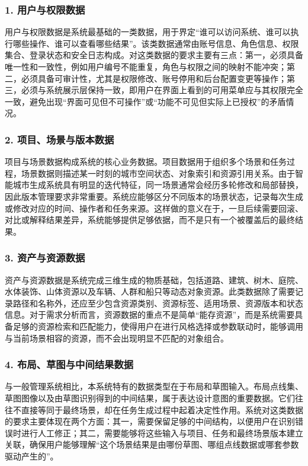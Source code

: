\documentclass[UTF8,a4paper,10pt]{ctexart}
\begin{document}
\subsubsection*{1. 用户与权限数据}
用户与权限数据是系统最基础的一类数据，用于界定“谁可以访问系统、谁可以执行哪些操作、谁可以查看哪些结果”。该类数据通常由账号信息、角色信息、权限集合、登录状态和安全日志构成。对这类数据的要求主要有三点：第一，必须具备唯一性和一致性，例如用户编号不能重复，角色与权限之间的映射不能冲突；第二，必须具备可审计性，尤其是权限修改、账号停用和后台配置变更等操作；第三，必须与系统展示层保持一致，即用户在界面上看到的可用菜单应与其权限完全一致，避免出现“界面可见但不可操作”或“功能不可见但实际上已授权”的矛盾情况。

\subsubsection*{2. 项目、场景与版本数据}
项目与场景数据构成系统的核心业务数据。项目数据用于组织多个场景和任务过程，场景数据则描述某一时刻的城市空间状态、对象索引和资源引用关系。由于智能城市生成系统具有明显的迭代特征，同一场景通常会经历多轮修改和局部替换，因此版本管理要求非常重要。系统应能够区分不同版本的场景状态，记录每次生成或修改对应的时间、操作者和任务来源。这样做的意义在于，一旦后续需要回滚、对比或解释结果差异，系统能够提供足够依据，而不是只有一个被覆盖后的最终结果。

\subsubsection*{3. 资产与资源数据}
资产与资源数据是系统完成三维生成的物质基础，包括道路、建筑、树木、庭院、水体装饰、山体资源以及车辆、人群和船只等动态对象资源。此类数据除了需要记录路径和名称外，还应至少包含资源类别、资源标签、适用场景、资源版本和状态信息。对于需求分析而言，资源数据的重点不是简单“能存资源”，而是系统需要具备足够的资源检索和匹配能力，使得用户在进行风格选择或参数联动时，能够调用与当前场景相容的资源，而不会出现明显不匹配的对象组合。

\subsubsection*{4. 布局、草图与中间结果数据}
与一般管理系统相比，本系统特有的数据类型在于布局和草图输入。布局点线集、草图图像以及由草图识别得到的中间结果，属于表达设计意图的重要数据。它们往往不直接等同于最终场景，却在任务生成过程中起着决定性作用。系统对这类数据的要求主要体现在两个方面：其一，需要保留足够的中间结构，以便用户在识别错误时进行人工修正；其二，需要能够将这些输入与项目、任务和最终场景版本建立关联，确保用户能够理解“这个场景结果是由哪份草图、哪组点线数据或哪套参数驱动产生的”。
\end{document}

